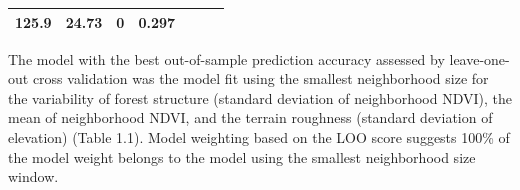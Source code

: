 \documentclass[twoside,12pt,final]{ucthesis-CA2012}
\begin{document}
\begin{ucmainmatter}
\begin{longtable}[]{@{}ccccccc@{}}
\begin{minipage}[t]{0.11\columnwidth}
125.9\strut
\end{minipage} & \begin{minipage}[t]{0.11\columnwidth}\centering\strut
24.73\strut
\end{minipage} & \begin{minipage}[t]{0.16\columnwidth}\centering\strut
0\strut
\end{minipage} & \begin{minipage}[t]{0.11\columnwidth}\centering\strut
0.297\strut
\end{minipage}\tabularnewline
\bottomrule
\end{longtable}
The model with the best out-of-sample prediction accuracy assessed by
leave-one-out cross validation was the model fit using the smallest
neighborhood size for the variability of forest structure (standard
deviation of neighborhood NDVI), the mean of neighborhood NDVI, and the
terrain roughness (standard deviation of elevation) (Table 1.1). Model
weighting based on the LOO score suggests 100\% of the model weight
belongs to the model using the smallest neighborhood size window.


\end{ucmainmatter}
\end{document}
